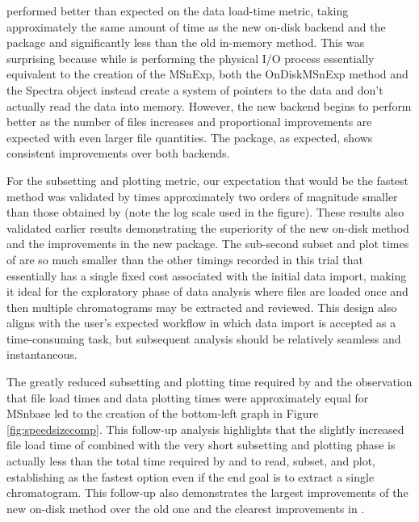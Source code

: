  performed better than expected on the data load-time metric, taking approximately the same amount of time as the new on-disk  backend and the  package and significantly less than the old in-memory method. This was surprising because while  is performing the physical I/O process essentially equivalent to the creation of the MSnExp, both the OnDiskMSnExp method and the Spectra object instead create a system of pointers to the data and don't actually read the data into memory. However, the new backend begins to perform better as the number of files increases and proportional improvements are expected with even larger file quantities. The  package, as expected, shows consistent improvements over both  backends.

For the subsetting and plotting metric, our expectation that  would be the fastest method was validated by times approximately two orders of magnitude smaller than those obtained by  (note the log scale used in the figure). These results also validated earlier results demonstrating the superiority of the new on-disk method \citep{gatto2015} and the improvements in the new  package. The sub-second subset and plot times of  are so much smaller than the other timings recorded in this trial that  essentially has a single fixed cost associated with the initial data import, making it ideal for the exploratory phase of data analysis where files are loaded once and then multiple chromatograms may be extracted and reviewed. This design also aligns with the user's expected workflow in which data import is accepted as a time-consuming task, but subsequent analysis should be relatively seamless and instantaneous.

The greatly reduced subsetting and plotting time required by  and the observation that file load times and data plotting times were approximately equal for MSnbase led to the creation of the bottom-left graph in Figure \ref{fig:speedsizecomp}. This follow-up analysis highlights that the slightly increased file load time of  combined with the very short subsetting and plotting phase is actually less than the total time required by  and  to read, subset, and plot, establishing  as the fastest option even if the end goal is to extract a single chromatogram. This follow-up also demonstrates the largest improvements of the new  on-disk method over the old one and the clearest improvements in .

